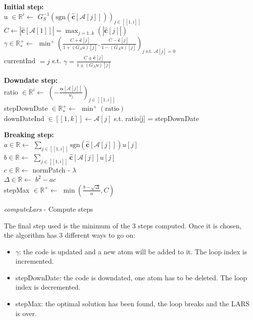 \documentclass{ipol}
\newcommand{\dsize}{k}
\newcommand{\code}{\bm{\alpha}}
\newcommand{\clars}{\hat{\textbf{c}}}
\newcommand{\A}{\mathcal{A}}
\begin{document}
\begin{algorithm}[H]
\textbf{Initial step:}\\
\vspace{0.5mm}
u $\in \mathbb{R}^i \leftarrow$ $G_S^{-1} (\text{sgn}(\clars[\A[j]]))_{j\in [\![1, i]\!]}$\\
$C \leftarrow |\clars[\A[1]]| = \max_{j=1..\dsize}(|\clars[j]|)$\\
$\gamma \in \mathbb{R}^+_* \leftarrow$ $\min^+\left(\frac{C + \clars[j]}{1 + (G_Au)[j]}, \frac{C - \clars[j]}{1 - (G_Au)[j]}\right)_{j \text{ s.t. } \A[j] = 0}$\\
currentInd $=j$ s.t. $\gamma = \frac{C \pm \clars[j]}{1 \pm (G_Au)[j]}$\\
\vspace{2mm}

\textbf{Downdate step:}\\
\vspace{0.5mm}
ratio $\in \mathbb{R}^i \leftarrow$ $\left(-\frac{\code[\A[j]]}{u_j}\right)_{j\in[\![1, i]\!]}$\\
stepDownDate $\in \mathbb{R}^+_* \leftarrow$ $\min^+(\text{ratio})$ \\
downDateInd $\in [\![1, \dsize]\!] \leftarrow \A[j]$ s.t. ratio[j] =	stepDownDate\\
\vspace{2mm}

\textbf{Breaking step:}\\
\vspace{0.5mm}
$a \in \mathbb{R} \leftarrow$ $\sum_{j \in [\![1, i]\!]} \text{sgn}(\clars[\A[j]])u[j]$\\
$b \in \mathbb{R} \leftarrow$ $\sum_{j \in [\![1, i]\!]} \clars[\A[j]] u[j]$\\
$c \in \mathbb{R} \leftarrow$ normPatch - $\lambda$\\
$\Delta \in \mathbb{R} \leftarrow$ $b^2 - ac$ \\
stepMax $\in \mathbb{R}^+ \leftarrow$ $\min(\frac{b - \sqrt{\Delta}}{a}, C)$ \\
\vspace{2mm}

\caption{\textit{computeLars} - Compute steps}
\end{algorithm}

\newpage

\noindent The final step used is the minimum of the 3 steps computed. Once it is chosen, the algorithm has 3 different ways to go on:
\begin{itemize}
	\item $\gamma$: the code is updated and a new atom will be added to it. The loop index is incremented.
	\item stepDownDate: the code is downdated, one atom has to be deleted. The loop index is decremented.
	\item stepMax: the optimal solution has been found, the loop breaks and the LARS is over.
\end{itemize}
\end{document}
